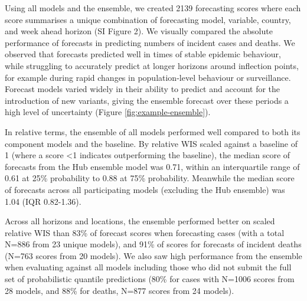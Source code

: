 \documentclass[
]{article}
\begin{document}
Using all models and the ensemble, we created 2139 forecasting scores where each score summarises a unique combination of forecasting model, variable, country, and week ahead horizon (SI Figure 2). We visually compared the absolute performance of forecasts in predicting numbers of incident cases and deaths. We observed that forecasts predicted well in times of stable epidemic behaviour, while struggling to accurately predict at longer horizons around inflection points, for example during rapid changes in population-level behaviour or surveillance. Forecast models varied widely in their ability to predict and account for the introduction of new variants, giving the ensemble forecast over these periods a high level of uncertainty (Figure \ref{fig:example-ensemble}).

In relative terms, the ensemble of all models performed well compared to both its component models and the baseline. By relative WIS scaled against a baseline of 1 (where a score \textless1 indicates outperforming the baseline), the median score of forecasts from the Hub ensemble model was 0.71, within an interquartile range of 0.61 at 25\% probability to 0.88 at 75\% probability. Meanwhile the median score of forecasts across all participating models (excluding the Hub ensemble) was 1.04 (IQR 0.82-1.36).

Across all horizons and locations, the ensemble performed better on scaled relative WIS than 83\% of forecast scores when forecasting cases (with a total N=886 from 23 unique models), and 91\% of scores for forecasts of incident deaths (N=763 scores from 20 models). We also saw high performance from the ensemble when evaluating against all models including those who did not submit the full set of probabilistic quantile predictions (80\% for cases with N=1006 scores from 28 models, and 88\% for deaths, N=877 scores from 24 models).
\end{document}
